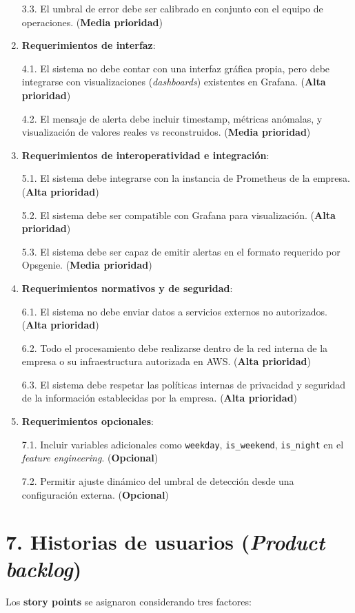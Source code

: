 \documentclass[
11pt, %
]{charter}
\begin{document}
\begin{enumerate}
 3.3. El umbral de error debe ser calibrado en conjunto con el equipo de operaciones. (\textbf{Media prioridad})
    \item \textbf{Requerimientos de interfaz}:

 4.1. El sistema no debe contar con una interfaz gráfica propia, pero debe integrarse con visualizaciones (\textit{dashboards}) existentes en Grafana. (\textbf{Alta prioridad})

 4.2. El mensaje de alerta debe incluir timestamp, métricas anómalas, y visualización de valores reales vs reconstruidos. (\textbf{Media prioridad})
    \item \textbf{Requerimientos de interoperatividad e integración}:

 5.1. El sistema debe integrarse con la instancia de Prometheus de la empresa. (\textbf{Alta prioridad})

 5.2. El sistema debe ser compatible con Grafana para visualización. (\textbf{Alta prioridad})

 5.3. El sistema debe ser capaz de emitir alertas en el formato requerido por Opsgenie. (\textbf{Media prioridad})
    \item \textbf{Requerimientos normativos y de seguridad}:

 6.1. El sistema no debe enviar datos a servicios externos no autorizados. (\textbf{Alta prioridad})

 6.2. Todo el procesamiento debe realizarse dentro de la red interna de la empresa o su infraestructura autorizada en AWS. (\textbf{Alta prioridad})

 6.3. El sistema debe respetar las políticas internas de privacidad y seguridad de la información establecidas por la empresa. (\textbf{Alta prioridad})
    \item \textbf{Requerimientos opcionales}:

 7.1. Incluir variables adicionales como \verb|weekday|, \verb|is_weekend|, \verb|is_night| en el \textit{feature engineering}. (\textbf{Opcional})

 7.2. Permitir ajuste dinámico del umbral de detección desde una configuración externa. (\textbf{Opcional}) 
\end{enumerate}
   
    
\section{7. Historias de usuarios (\textit{Product backlog})}
\label{sec:backlog}

Los \textbf{story points} se asignaron considerando tres factores:
\end{document}
